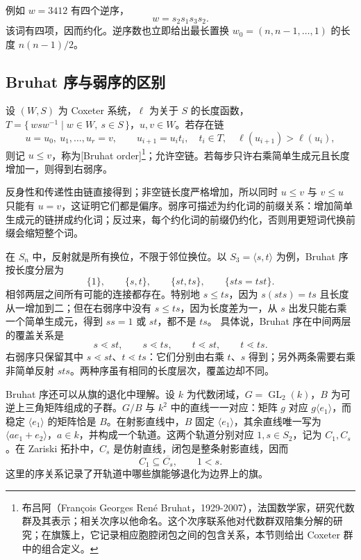 例如 \(w=3412\) 有四个逆序，
\[
	w=s_2s_1s_3s_2.
\]
该词有四项，因而约化。逆序数也立即给出最长置换 \(w_0=(n,n-1,\ldots,1)\) 的长度 \(n(n-1)/2\)。

\subsection{Bruhat 序与弱序的区别}
\label{b5:subsec:A01:03}

\begin{definition}\label{b5:def:bruhat-order}
	设 \((W,S)\) 为 Coxeter 系统，\(\ell\) 为关于 \(S\) 的长度函数，\(T=\{\,wsw^{-1}\mid w\in W,\ s\in S\,\}\)，\(u,v\in W\)。若存在链
	\[
		u=u_0,\ u_1,\ldots,u_r=v,\qquad u_{i+1}=u_it_i,\quad t_i\in T,\quad \ell(u_{i+1})>\ell(u_i),
	\]
	则记 \(u\le v\)，称为[Bruhat order]\footnote{布吕阿（François Georges René Bruhat，1929-2007），法国数学家，研究代数群及其表示；相关次序以他命名。这个次序联系他对代数群双陪集分解的研究；在旗簇上，它记录相应胞腔闭包之间的包含关系，本节则给出 Coxeter 群中的组合定义。}；允许空链。若每步只许右乘简单生成元且长度增加一，则得到右弱序。
\end{definition}

反身性和传递性由链直接得到；非空链长度严格增加，所以同时 \(u\le v\) 与 \(v\le u\) 只能有 \(u=v\)，这证明它们都是偏序。弱序可描述为约化词的前缀关系：增加简单生成元的链拼成约化词；反过来，每个约化词的前缀仍约化，否则用更短词代换前缀会缩短整个词。

\ProseParagraphBreak
在 \(S_n\) 中，反射就是所有换位，不限于邻位换位。以 \(S_3=\langle s,t\rangle\) 为例，Bruhat 序按长度分层为
\[
	\{1\},\qquad\{s,t\},\qquad\{st,ts\},\qquad\{sts=tst\}.
\]
相邻两层之间所有可能的连接都存在。特别地 \(s\le ts\)，因为 \(s(sts)=ts\) 且长度从一增加到二；但在右弱序中没有 \(s\le ts\)，因为长度差为一，从 \(s\) 出发只能右乘一个简单生成元，得到 \(ss=1\) 或 \(st\)，都不是 \(ts\)。 具体说，Bruhat 序在中间两层的覆盖关系是
\[
	s\lessdot st,\qquad s\lessdot ts,\qquad t\lessdot st,\qquad t\lessdot ts.
\]
右弱序只保留其中 \(s\lessdot st\)、\(t\lessdot ts\)：它们分别由右乘 \(t\)、\(s\) 得到；另外两条需要右乘非简单反射 \(sts\)。两种序虽有相同的长度层次，覆盖边却不同。

\ProseParagraphBreak
Bruhat 序还可以从旗的退化中理解。设 \(k\) 为代数闭域，\(G=\operatorname{GL}_2(k)\)，\(B\) 为可逆上三角矩阵组成的子群。\(G/B\) 与 \(k^2\) 中的直线一一对应：矩阵 \(g\) 对应 \(g\langle e_1\rangle\)，而稳定 \(\langle e_1\rangle\) 的矩阵恰是 \(B\)。在射影直线中，\(B\) 固定 \(\langle e_1\rangle\)，其余直线唯一写为 \(\langle a e_1+e_2\rangle\)，\(a\in k\)，并构成一个轨道。这两个轨道分别对应 \(1,s\in S_2\)，记为 \(C_1,C_s\)。在 Zariski 拓扑中，\(C_s\) 是仿射直线，闭包是整条射影直线，因而
\[
	C_1\subseteq\overline{C_s},\qquad 1<s.
\]
这里的序关系记录了开轨道中哪些旗能够退化为边界上的旗。

